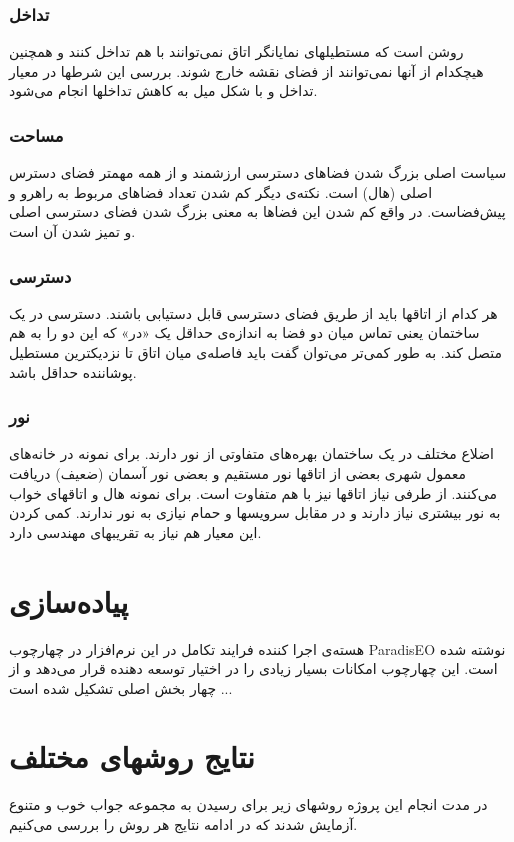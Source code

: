 \documentclass{report}
\begin{document}
\subsubsection{تداخل}
روشن است که مستطیلهای نمایانگر اتاق نمی‌توانند با هم تداخل کنند و همچنین هیچکدام از آنها نمی‌توانند از فضای نقشه خارج شوند. بررسی این شرطها در معیار تداخل و با شکل میل به کاهش تداخلها انجام می‌شود.

\subsubsection{مساحت}
سیاست اصلی بزرگ شدن فضاهای دسترسی ارزشمند و از همه مهمتر فضای دسترس اصلی (هال) است. نکته‌ی دیگر کم شدن تعداد فضاهای مربوط به راهرو و پیش‌فضاست. در واقع کم شدن این فضاها به معنی بزرگ شدن فضای دسترسی اصلی و تمیز شدن آن است.

\subsubsection{دسترسی}
هر کدام از اتاقها باید از طریق فضای دسترسی قابل دستیابی باشند. دسترسی در یک ساختمان یعنی تماس میان دو فضا به اندازه‌ی حداقل یک «در» که این دو را به هم متصل کند. به طور کمی‌تر می‌توان گفت باید فاصله‌ی میان اتاق تا نزدیکترین مستطیل پوشاننده حداقل باشد.

\subsubsection{نور}
اضلاع مختلف در یک ساختمان بهره‌های متفاوتی از نور دارند. برای نمونه در خانه‌های معمول شهری بعضی از اتاقها نور مستقیم و بعضی نور آسمان (ضعیف) دریافت می‌کنند. از طرفی نیاز اتاقها نیز با هم متفاوت است. برای نمونه هال و اتاقهای خواب به نور بیشتری نیاز دارند و در مقابل سرویسها و حمام نیازی به نور ندارند. کمی کردن این معیار هم نیاز به تقریبهای مهندسی دارد. 

\section{پیاده‌سازی}
هسته‌ی اجرا کننده فرایند تکامل در این نرم‌افزار در چهارچوب ParadisEO نوشته شده است. این چهارچوب امکانات بسیار زیادی را در اختیار توسعه دهنده قرار می‌دهد و از چهار بخش اصلی تشکیل شده است ...

\section{نتایج روشهای مختلف}
در مدت انجام این پروژه روشهای زیر برای رسیدن به مجموعه جواب خوب و متنوع آزمایش شدند که در ادامه نتایج هر روش را بررسی می‌کنیم.
\end{document}
